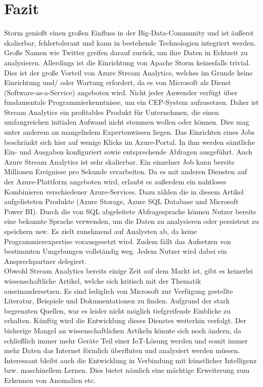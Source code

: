 \section{Fazit}
Storm genießt einen großen Einfluss in der Big-Data-Community und ist äußerst skalierbar, fehlertolerant und kann in bestehende Technologien integriert werden. Große Namen wie Twitter greifen darauf zurück, um ihre Daten in Echtzeit zu analysieren. Allerdings ist die Einrichtung von Apache Storm keinesfalls trivial. Dies ist der große Vorteil von Azure Stream Analytics, welches im Grunde keine Einrichtung und/ oder Wartung erfordert, da es von Microsoft als Dienst (Software-as-a-Service) angeboten wird. Nicht jeder Anwender verfügt über fundamentale Programmierkenntnisse, um ein CEP-System aufzusetzen. Daher ist Stream Analytics ein profitables Produkt für Unternehmen, die einen umfangreichen initialen Aufwand nicht stemmen wollen oder können. Dies mag unter anderem an mangelndem Expertenwissen liegen. Das Einrichten eines Jobs beschränkt sich hier auf wenige Klicks im Azure-Portal. In ihm werden sämtliche Ein- und Ausgaben konfiguriert sowie entsprechende Abfragen ausgeführt. Auch Azure Stream Analytics ist sehr skalierbar. Ein einzelner Job kann bereits Millionen Ereignisse pro Sekunde verarbeiten. Da es mit anderen Diensten auf der Azure-Plattform angeboten wird, erlaubt es außerdem ein nahtloses Kombinieren verschiedener Azure-Services. Dazu zählen die in diesem Artikel aufgelisteten Produkte (Azure Storage, Azure SQL Database und Microsoft Power BI). Durch die von SQL abgeleitete Abfragesprache können Nutzer bereits eine bekannte Sprache verwenden, um die Daten zu analysieren oder persistent zu speichern usw. Es zielt zunehmend auf Analysten ab, da keine Programmierexpertise vorausgesetzt wird. Zudem fällt das Aufsetzen von bestimmten Umgebungen vollständig weg. Jedem Nutzer wird dabei ein Ansprechpartner delegiert.\\ Obwohl Stream Analytics bereits einige Zeit auf dem Markt ist, gibt es keinerlei wissenschaftliche Artikel, welche sich kritisch mit der Thematik auseinandersetzen. Es sind lediglich von Microsoft zur Verfügung gestellte Literatur, Beispiele und Dokumentationen zu finden. Aufgrund der stark begrenzten Quellen, war es leider nicht möglich tiefgreifende Einblicke zu erhalten. Künftig wird die Entwicklung dieses Dienstes weiterhin verfolgt. Der bisherige Mangel an wissenschaftlichen Artikeln könnte sich noch ändern, da schließlich immer mehr Geräte Teil einer IoT-Lösung werden und somit immer mehr Daten das Internet förmlich überfluten und analysiert werden müssen. Interessant bleibt auch die Entwicklung in Verbindung mit künstlicher Intelligenz bzw. maschinellem Lernen. Dies bietet nämlich eine mächtige Erweiterung zum Erkennen von Anomalien etc.
 

%

\ifCLASSOPTIONcaptionsoff
  \newpage
\fi
